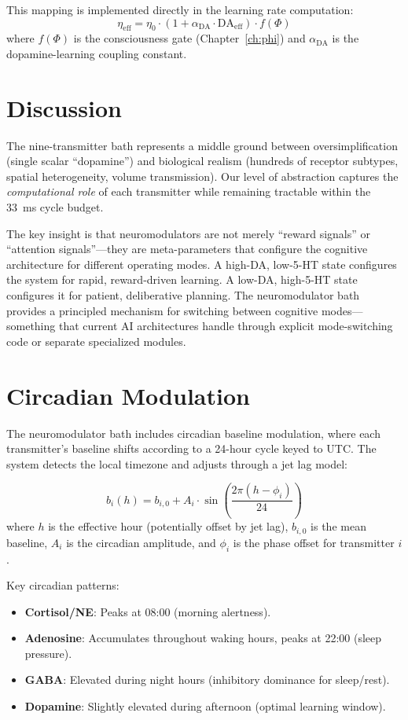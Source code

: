 \documentclass[12pt]{book}
\begin{document}
This mapping is implemented directly in the learning rate computation:
\begin{equation}
\eta_{\text{eff}} = \eta_0 \cdot (1 + \alpha_{\text{DA}} \cdot \text{DA}_{\text{eff}}) \cdot f(\Phi)
\end{equation}
where $f(\Phi)$ is the consciousness gate (Chapter~\ref{ch:phi}) and $\alpha_{\text{DA}}$ is the dopamine-learning coupling constant.

\section{Discussion}

The nine-transmitter bath represents a middle ground between oversimplification (single scalar ``dopamine'') and biological realism (hundreds of receptor subtypes, spatial heterogeneity, volume transmission). Our level of abstraction captures the \textit{computational role} of each transmitter while remaining tractable within the 33~ms cycle budget.

The key insight is that neuromodulators are not merely ``reward signals'' or ``attention signals''---they are meta-parameters that configure the cognitive architecture for different operating modes. A high-DA, low-5-HT state configures the system for rapid, reward-driven learning. A low-DA, high-5-HT state configures it for patient, deliberative planning. The neuromodulator bath provides a principled mechanism for switching between cognitive modes---something that current AI architectures handle through explicit mode-switching code or separate specialized modules.

\section{Circadian Modulation}

The neuromodulator bath includes circadian baseline modulation, where each transmitter's baseline shifts according to a 24-hour cycle keyed to UTC. The system detects the local timezone and adjusts through a jet lag model:

\begin{equation}
b_i(h) = b_{i,0} + A_i \cdot \sin\!\left(\frac{2\pi (h - \phi_i)}{24}\right)
\end{equation}
where $h$ is the effective hour (potentially offset by jet lag), $b_{i,0}$ is the mean baseline, $A_i$ is the circadian amplitude, and $\phi_i$ is the phase offset for transmitter $i$.

Key circadian patterns:
\begin{itemize}
  \item \textbf{Cortisol/NE}: Peaks at 08:00 (morning alertness).
  \item \textbf{Adenosine}: Accumulates throughout waking hours, peaks at 22:00 (sleep pressure).
  \item \textbf{GABA}: Elevated during night hours (inhibitory dominance for sleep/rest).
  \item \textbf{Dopamine}: Slightly elevated during afternoon (optimal learning window).
\end{itemize}
\end{document}
